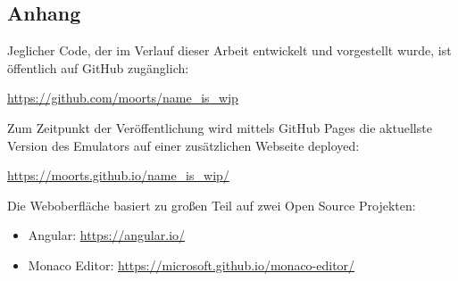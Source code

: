 \begin{appendices}
\renewcommand{\appendixtocname}{Anhänge}
\chapter{Anhang}
Jeglicher Code, der im Verlauf dieser Arbeit entwickelt und vorgestellt wurde, ist öffentlich auf GitHub zugänglich: 


\url{https://github.com/moorts/name_is_wip}
\medskip

\noindent
Zum Zeitpunkt der Veröffentlichung wird mittels GitHub Pages die aktuellste Version des Emulators auf einer zusätzlichen Webseite deployed: 

\url{https://moorts.github.io/name_is_wip/}
\medskip

\noindent
Die Weboberfläche basiert zu großen Teil auf zwei Open Source Projekten:

\begin{itemize}
	\item Angular: \url{https://angular.io/}
	\item Monaco Editor: \url{https://microsoft.github.io/monaco-editor/}
\end{itemize}

\end{appendices}